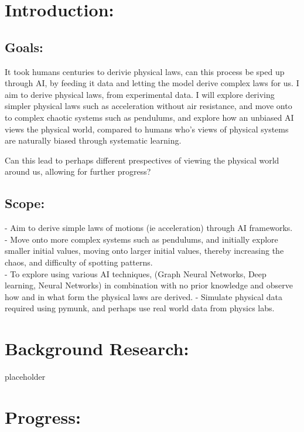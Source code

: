 \documentclass{article}
\begin{document}
\section{Introduction: }

\subsection{Goals: }

It took humans centuries to derivie physical laws, can this process be sped up through AI, by feeding it data and letting the model derive complex laws for us. I aim to derive physical laws, from experimental data. I will explore deriving simpler physical laws such as acceleration without air resistance, and move onto to complex chaotic systems such as pendulums, and explore how an unbiased AI views the physical world, compared to humans who's views of physical systems are naturally biased through systematic learning. 

Can this lead to perhaps different prespectives of viewing the physical world around us, allowing for further progress? 


\subsection{Scope: }


 - Aim to derive simple laws of motions (ie acceleration) through AI frameworks.\\ 

- Move onto more complex systems such as pendulums, and initially explore smaller initial values, moving onto larger initial values, 
thereby increasing the chaos, and difficulty of spotting patterns. \\

- To explore using various AI techniques, (Graph Neural Networks, Deep learning, Neural Networks) in combination with no prior knowledge and observe how and in what form the physical laws are derived.  
- Simulate physical data required using pymunk, and perhaps use real world data from physics labs.\\ 

\section{Background Research: }

placeholder 

\section{Progress: }
\end{document}
